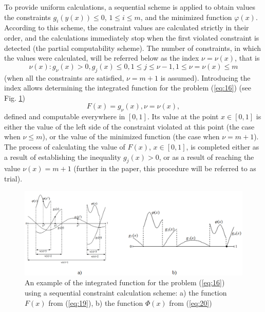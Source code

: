 \documentclass[smallextended]{svjour3}       %
\begin{document}
To provide uniform calculations, a sequential scheme is applied to obtain values the constraints $g_i(y(x)) \leq 0$, $1 \leq i \leq m$, and the minimized function $\varphi(x)$. According to this scheme, the constraint values are calculated strictly in their order, and the calculations immediately stop when the first violated constraint is detected (the partial computability scheme). The number of constraints, in which the values were calculated, will be referred below as the index $\nu=\nu(x)$, that is
\begin{equation}\label{eq:18}
\nu(x) : g_\nu(x)>0, g_j(x)\leq 0, 1 \leq j \leq \nu - 1, 1 \leq \nu = \nu(x) \leq m
\end{equation}
(when all the constraints are satisfied, $\nu=m+1$ is assumed). Introducing the index allows determining the integrated function for the problem (\ref{eq:16}) (see Fig. \ref{fig:1})
\begin{equation}\label{eq:19}
F(x)=g_\nu(x), \nu=\nu(x),
\end{equation}
defined and computable everywhere in $[0,1]$. Its value at the point $x\in [0,1]$ is either the value of the left side of the constraint violated at this point (the case when $\nu \leq m$), or the value of the minimized function (the case when $\nu = m + 1$). The process of calculating the value of $F(x)$, $x\in [0,1]$, is completed either as a result of establishing the inequality $g_j(x)>0$, or as a result of reaching the value $\nu(x)=m+1$ (further in the paper, this procedure will be referred to as trial).

\begin{figure}
  \centering
  \includegraphics[width=\linewidth]{fig1}
  \caption{An example of the integrated function for the problem (\ref{eq:16}) using a sequential constraint calculation scheme: a) the function $F(x)$ from (\ref{eq:19}), b) the function $\Phi(x)$ from (\ref{eq:20})}
  \label{fig:1}
\end{figure}
\end{document}
